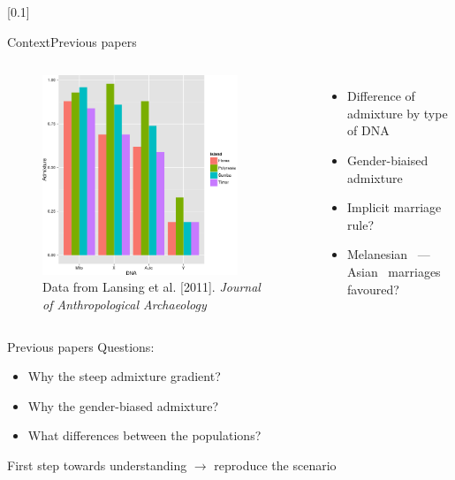 \documentclass[10pt, aspectratio=43]{beamer}
\begin{document}
[0.1]{}{}{}
\begin{frame}{Context}{Previous papers}
\begin{columns}
  \begin{figure}
    \includegraphics[width=0.85\textwidth]{../data/lansing-modified.png}
    \caption{Data from Lansing et al. [2011]. \textit{Journal of
Anthropological Archaeology}}
  \end{figure}

  \begin{itemize}
    \item Difference of admixture by type of DNA
    \item Gender-biaised admixture
    \item Implicit marriage rule?
    \item Melanesian~\mars{} --- Asian~\female{} marriages favoured?
  \end{itemize}

\end{columns}
\end{frame}

\begin{frame}{}{Previous papers}
\color{masseyWhite}
Questions:
\begin{itemize}
  \item Why the steep admixture gradient?
  \item Why the gender-biased admixture?
  \item What differences between the populations?
\end{itemize}
\vspace*{2em}
First step towards understanding $\rightarrow$ reproduce the scenario
\end{frame}
\end{document}
